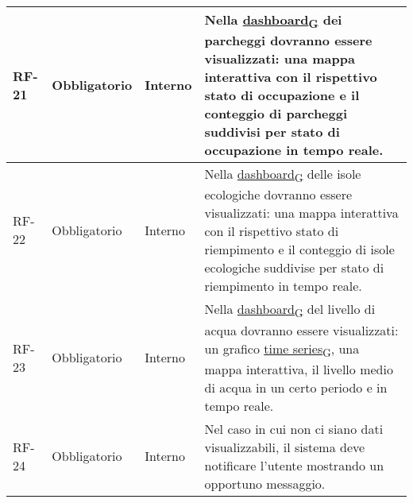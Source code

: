 \begin{longtable}{|>{\centering\arraybackslash}m{}|>{\centering\arraybackslash}m{}|>{\centering\arraybackslash}m{}|>{\centering\arraybackslash}m{}|}
	RF-21           & Obbligatorio        & Interno                                                                                                           & Nella \href{https://7last.github.io/docs/rtb/documentazione-interna/glossario\#dashboard}{dashboard\textsubscript{G}} dei parcheggi dovranno essere visualizzati: una mappa interattiva con il rispettivo stato di occupazione e il conteggio di parcheggi suddivisi per stato di occupazione in tempo reale.                                                                                                                                                                                        \\\hline
	RF-22           & Obbligatorio        & Interno                                                                                                           & Nella \href{https://7last.github.io/docs/rtb/documentazione-interna/glossario\#dashboard}{dashboard\textsubscript{G}} delle isole ecologiche dovranno essere visualizzati: una mappa interattiva con il rispettivo stato di riempimento e il conteggio di isole ecologiche suddivise per stato di riempimento in tempo reale.                                                                                                                                                                        \\\hline
	RF-23           & Obbligatorio        & Interno                                                                                                           & Nella \href{https://7last.github.io/docs/rtb/documentazione-interna/glossario\#dashboard}{dashboard\textsubscript{G}} del livello di acqua dovranno essere visualizzati: un grafico \href{https://7last.github.io/docs/rtb/documentazione-interna/glossario\#time-series}{time series\textsubscript{G}}, una mappa interattiva, il livello medio di acqua in un certo periodo e in tempo reale.                                                                                                      \\\hline
	RF-24           & Obbligatorio        & Interno                                                                                                           & Nel caso in cui non ci siano dati visualizzabili, il sistema deve notificare l'utente mostrando un opportuno messaggio.                                                                                                                                                                                                                                                                                                                                                                              \\\hline

\end{longtable}
